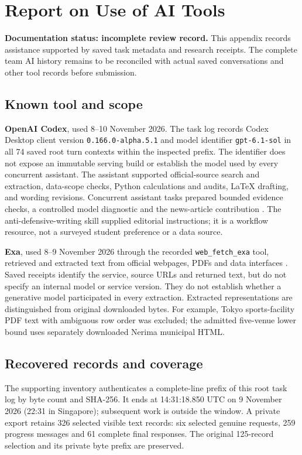 \section*{Report on Use of AI Tools}
\textbf{Documentation status: incomplete review record.}
This appendix records assistance supported by saved task metadata and research
receipts. The complete team AI history remains to be reconciled with actual
saved conversations and other tool records before submission.

\subsection*{Known tool and scope}
\textbf{OpenAI Codex}, used 8--10 November 2026. The task log records Codex
Desktop client version \texttt{0.166.0-alpha.5.1} and model identifier
\texttt{gpt-6.1-sol} in all 74 saved root turn contexts within the inspected prefix.
The identifier does not expose an immutable serving build or establish the
model used by every concurrent assistant. The assistant supported official-source
search and extraction, data-scope checks, Python calculations and audits,
LaTeX drafting, and wording revisions. Concurrent assistant tasks prepared
bounded evidence checks, a controlled model diagnostic and the news-article
contribution \cite{openai}. The anti-defensive-writing skill supplied editorial instructions;
it is a workflow resource, not a surveyed student preference or a data source.

\textbf{Exa}, used 8--9 November 2026 through the recorded
\texttt{web\_fetch\_exa} tool, retrieved and extracted text from official
webpages, PDFs and data interfaces \cite{exa}. Saved receipts identify the
service, source URLs and returned text, but do not specify an internal model
or service version. They do not establish whether a generative model
participated in every extraction. Extracted representations are distinguished
from original downloaded bytes. For example, Tokyo sports-facility PDF text
with ambiguous row order was excluded; the admitted five-venue lower bound
uses separately downloaded Nerima municipal HTML.

\clearpage
\subsection*{Recovered records and coverage}
The supporting inventory authenticates a complete-line prefix of this root
task log by byte count and SHA-256. It ends at 14:31:18.850 UTC on
9 November 2026 (22:31 in Singapore); subsequent work is outside the window.
A private export retains 326 selected visible text records: six selected
genuine requests, 259 progress messages and 61 complete final responses.
The original 125-record selection and its private byte prefix are preserved.

